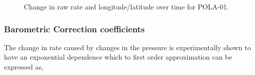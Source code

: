 \documentclass[prX, twocolumn, a4paper]{revtex4}
\begin{document}
\begin{figure}
    \centering
    \hspace{0.5cm}
    \caption{Change in raw rate and longitude/latitude over time for POLA-01.}\label{fig:rate_coord_time_01}
\end{figure}

\subsubsection{Barometric Correction coefficients}

The change in rate caused by changes in the pressure is experimentally shown to have an exponential dependence which to first order approximation\cite{Kobelev} \cite{doi:10.1029/2012JA018026} can be expressed as, 
\end{document}
